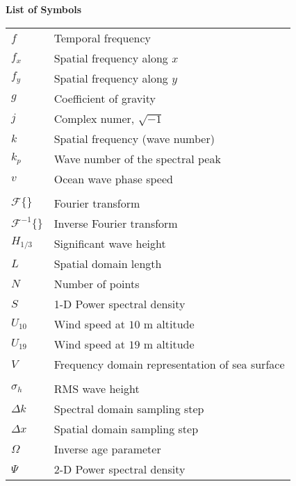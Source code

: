 \noindent\Large{\bf{List of Symbols}}

\vspace{24pt}

\small\normalsize
\begin{supertabular}{ll}
$f$ & Temporal frequency \\
$f_x$ & Spatial frequency along $x$ \\
$f_y$ & Spatial frequency along $y$ \\
$g$ & Coefficient of gravity \\
$j$ & Complex numer, $\sqrt{-1}$ \\
$k$ & Spatial frequency (wave number) \\
$k_p$ & Wave number of the spectral peak \\
$v$ & Ocean wave phase speed \\
\\
$\mathcal{F}\{\}$ & Fourier transform \\
$\mathcal{F}^{-1}\{\}$ & Inverse Fourier transform \\
$H_{1/3}$ & Significant wave height \\
$L$ & Spatial domain length \\
$N$ & Number of points \\
$S$ & 1-D Power spectral density \\
$U_{10}$ & Wind speed at $10$ m altitude \\
$U_{19}$ & Wind speed at $19$ m altitude \\
$V$ & Frequency domain representation of sea surface\\
\\
$\sigma_h$ & RMS wave height \\
$\Delta k$ & Spectral domain sampling step \\
$\Delta x$ & Spatial domain sampling step \\
$\Omega$ & Inverse age parameter \\
$\Psi $ & 2-D Power spectral density \\
\end{supertabular}